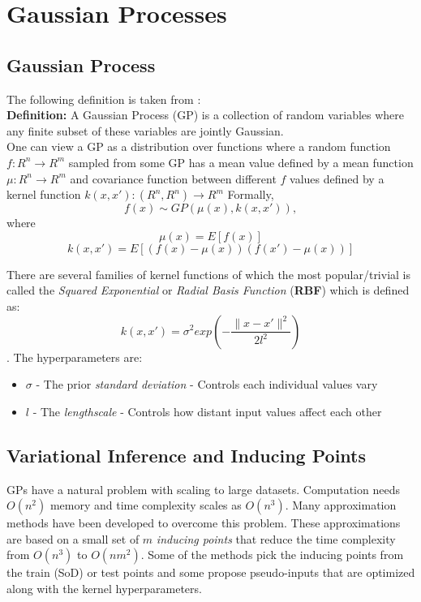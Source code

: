 \section{Gaussian Processes}



\subsection{Gaussian Process}
The following definition is taken from \cite{Rasmussen2006Gaussian2006}: \\
\textbf{Definition:} A Gaussian Process (GP) is a collection of random variables where any finite subset of these variables are jointly Gaussian. \\
One can view a GP as a distribution over functions where a random function $f:R^{n} \rightarrow R^{m}$ sampled from some GP has a mean value defined by a mean function $\mu: R^{n} \rightarrow R^{m}$ and covariance function between different $f$ values defined by a kernel function $k(x,x'): (R^{n}, R^{n}) \rightarrow R^{m} $ 
Formally,
$$f(x) \sim GP(\mu(x), k(x,x')),$$ where $$\mu(x)=E[f(x)]$$ $$k(x,x')=E[(f(x)-\mu(x))(f(x')-\mu(x))]$$ 

There are several families of kernel functions of which the most popular/trivial is called the \textit{Squared Exponential} or \textit{Radial Basis Function} (\textbf{RBF}) which is defined as: \\
$$k(x,x')=\sigma^{2} exp(-\frac{\lVert x-x' \rVert ^{2}}{2l^{2}})$$. The hyperparameters are: \\
\begin{itemize}
    \item $\sigma$ - The prior \textit{standard deviation} - Controls each individual values vary
    \item $l$ - The \textit{lengthscale} - Controls how distant input values affect each other
\end{itemize}

\subsection{Variational Inference and Inducing Points}
GPs have a natural problem with scaling to large datasets. Computation needs $O(n^{2})$ memory and   time complexity scales as $O(n^{3})$. Many approximation methods have been developed to overcome this problem. These approximations are based on a small set of $m$ \textit{inducing points} that reduce the time complexity from $O(n^{3})$ to $O(nm^{2})$. Some of the methods pick the inducing points from the train (SoD) or test points and some propose pseudo-inputs that are optimized along with the kernel hyperparameters. 

